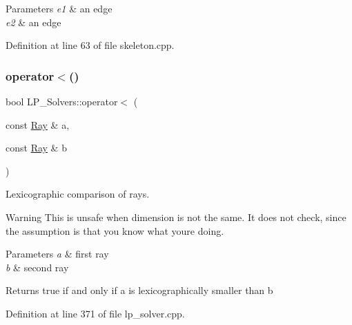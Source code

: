 \begin{DoxyParams}{Parameters}
{\em e1} & an edge \\
\hline
{\em e2} & an edge \\
\hline
\end{DoxyParams}


Definition at line 63 of file skeleton.\+cpp.

\mbox{\label{namespace_l_p___solvers_a28498e1aa874114a1ae27876d309b0d1}} 
\subsubsection{\texorpdfstring{operator$<$()}{operator<()}\hspace{0.1cm}{\footnotesize\ttfamily [3/3]}}
{\footnotesize\ttfamily bool L\+P\+\_\+\+Solvers\+::operator$<$ (\begin{DoxyParamCaption}\item[{const \hyperlink{group___c_l_s_solvers_class_l_p___solvers_1_1_ray}{Ray} \&}]{a,  }\item[{const \hyperlink{group___c_l_s_solvers_class_l_p___solvers_1_1_ray}{Ray} \&}]{b }\end{DoxyParamCaption})}



Lexicographic comparison of rays. 

\begin{DoxyWarning}{Warning}
This is unsafe when dimension is not the same. It does not check, since the assumption is that you know what you\textquotesingle{}re doing. 
\end{DoxyWarning}

\begin{DoxyParams}{Parameters}
{\em a} & first ray \\
\hline
{\em b} & second ray \\
\hline
\end{DoxyParams}
\begin{DoxyReturn}{Returns}
{\ttfamily true} if and only if {\ttfamily a} is lexicographically smaller than {\ttfamily b} 
\end{DoxyReturn}


Definition at line 371 of file lp\+\_\+solver.\+cpp.

\mbox{\label{namespace_l_p___solvers_a839482d44b36df2b4b70e5ab99662e45}} 
